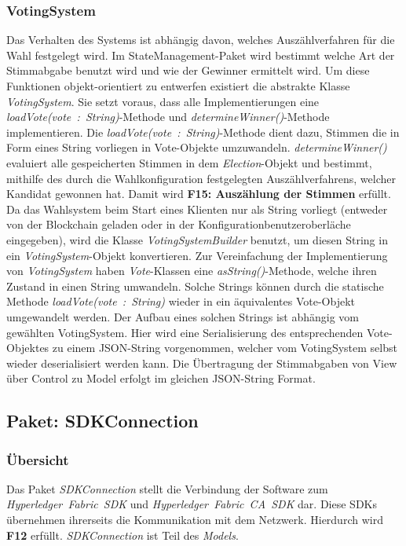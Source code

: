 \documentclass[parskip=full]{scrartcl}
\newcommand{\textitx}[1]{\mbox{\textit{#1}}}
\begin{document}
		\subsubsection{VotingSystem}
		Das Verhalten des Systems ist abhängig davon, welches Auszählverfahren für die Wahl festgelegt wird. Im StateManagement-Paket wird bestimmt welche Art der Stimmabgabe benutzt wird und wie der Gewinner ermittelt wird.
		Um diese Funktionen objekt-orientiert zu entwerfen existiert die abstrakte Klasse \textitx{VotingSystem}. Sie setzt voraus, dass alle Implementierungen eine \textitx{loadVote(vote : String)}-Methode und \textitx{determineWinner()}-Methode implementieren. Die \textitx{loadVote(vote : String)}-Methode dient dazu, Stimmen die in Form eines String vorliegen in Vote-Objekte umzuwandeln. \textitx{determineWinner()} evaluiert alle gespeicherten Stimmen in dem \textitx{Election}-Objekt und bestimmt, mithilfe des durch die Wahlkonfiguration festgelegten Auszählverfahrens, welcher Kandidat gewonnen hat. Damit wird \textbf{F15: Auszählung der Stimmen} erfüllt.
		Da das Wahlsystem beim Start eines Klienten nur als String vorliegt (entweder von der Blockchain geladen oder in der Konfigurationbenutzeroberläche eingegeben), wird die Klasse \textit{VotingSystemBuilder} benutzt, um diesen String in ein \textitx{VotingSystem}-Objekt konvertieren.
		Zur Vereinfachung der Implementierung von \textitx{VotingSystem} haben \textitx{Vote}-Klassen eine \textitx{asString()}-Methode, welche ihren Zustand in einen String umwandeln. Solche Strings können durch die statische Methode \textitx{loadVote(vote : String)} wieder in ein äquivalentes Vote-Objekt umgewandelt werden. Der Aufbau eines solchen Strings ist abhängig vom gewählten VotingSystem. Hier wird eine Serialisierung des entsprechenden Vote-Objektes zu einem JSON-String vorgenommen, welcher vom VotingSystem selbst wieder deserialisiert werden kann. Die Übertragung der Stimmabgaben von View über Control zu Model erfolgt im gleichen JSON-String Format.
	
	\subsection{Paket: SDKConnection}
	\subsubsection{Übersicht}
	Das Paket \textitx{SDKConnection} stellt die Verbindung der Software zum \textitx{Hyperledger Fabric SDK} und \textitx{Hyperledger Fabric CA SDK} dar. Diese SDKs übernehmen ihrerseits die Kommunikation mit dem Netzwerk. Hierdurch wird \textbf{F12} erfüllt. \textitx{SDKConnection} ist Teil des \textitx{Models}.
\end{document}
